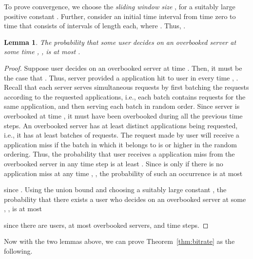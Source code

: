 \documentclass[conference]{IEEEtran}
\newtheorem{lemma}[theorem]{Lemma}
\begin{document}
To prove convergence, we choose the {\em sliding window size} , for a suitably  large positive constant . Further, consider an initial time interval from time zero to time  that consists of   intervals of length  each, where .  Thus,  . 
\begin{lemma}\label{lem:overbookhit2}
The probability that some user  decides on an overbooked server  at some time , ,  is at most  . 
\end{lemma}
\begin{proof}
Suppose user  decides on an overbooked server  at time . Then, it must be the case that 
. Thus, server  provided a application hit to user  in every time , . Recall that each server serves simultaneous requests by first batching the requests according to the requested applications, i.e., each batch contains requests for the same application, and then serving each batch in random order. Since server  is overbooked at time , it must have been overbooked during all the previous time steps. An overbooked server  has at least  distinct applications being requested, i.e., it has at least  batches of requests. The request made by user  will receive a application miss if the batch in which it belongs to is  or higher in the random ordering. Thus, the probability that user  receives a application miss from the overbooked server  in any time step  is at least . Since  is  only if there is no application miss at any time , , the probability of such an occurrence is at most

since .  Using the union bound and choosing a suitably large constant , the probability that there exists a user  who decides on an overbooked server  at some , ,  is at most

since there are  users, at most  overbooked servers, and  time steps. 
\end{proof}

Now with the two lemmas above, we can prove Theorem~\ref{thm:bitrate} as the following.
\end{document}
